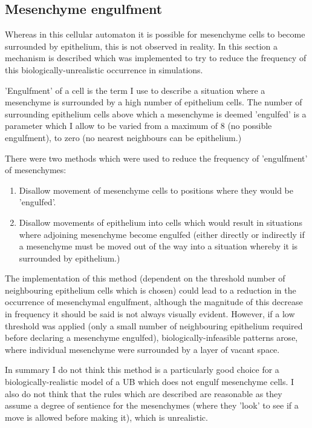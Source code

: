 \documentclass[pdftex,10pt,a4paper]{article}
\begin{document}
\subsection{Mesenchyme engulfment}\label{sec:engulfment}
Whereas in this cellular automaton it is possible for mesenchyme cells to become surrounded by epithelium, this is not observed in reality. In this section a mechanism is described which was implemented to try to reduce the frequency of this biologically-unrealistic occurrence in simulations.

'Engulfment' of a cell is the term I use to describe a situation where a mesenchyme is surrounded by a high number of epithelium cells. The number of surrounding epithelium cells above which a mesenchyme is deemed 'engulfed' is a parameter which I allow to be varied from a maximum of 8 (no possible engulfment), to zero (no nearest neighbours can be epithelium.)

There were two methods which were used to reduce the frequency of 'engulfment' of mesenchymes:

\begin{enumerate}
\item Disallow movement of mesenchyme cells to positions where they would be 'engulfed'.
\item Disallow movements of epithelium into cells which would result in situations where adjoining mesenchyme become engulfed (either directly or indirectly if a mesenchyme must be moved out of the way into a situation whereby it is surrounded by epithelium.)
\end{enumerate}

The implementation of this method (dependent on the threshold number of neighbouring epithelium cells which is chosen) could lead to a reduction in the occurrence of mesenchymal engulfment, although the magnitude of this decrease in frequency it should be said is not always visually evident. However, if a low threshold was applied (only a small number of neighbouring epithelium required before declaring a mesenchyme engulfed), biologically-infeasible patterns arose, where individual mesenchyme were surrounded by a layer of vacant space.

In summary I do not think this method is a particularly good choice for a biologically-realistic model of a UB which does not engulf mesenchyme cells. I also do not think that the rules which are described are reasonable as they assume a degree of sentience for the mesenchymes (where they 'look' to see if a move is allowed before making it), which is unrealistic.
\end{document}
